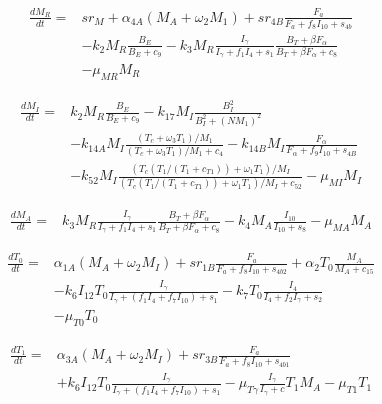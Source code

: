 \documentclass{article}
\begin{document}
	\begin{equation}
		\begin{aligned}
			\frac{dM_R}{dt} ={} & sr_M + \alpha_{4A}(M_A + \omega_2 M_1) + sr_{4B} \frac{F_a}{F_a + f_8 I_{10} + s_{4b}} \\
			& - k_2 M_R \frac{B_E}{B_E + c_9} -  k_3 M_R \frac{I_{\gamma}}{I_{\gamma} + f_1 I_4 + s_1} \frac{B_T + \beta F_{\alpha}}{B_T + \beta F_{\alpha} + c_8} \\
			&- \mu_{MR} M_R
		\end{aligned}
	\end{equation}
	
	\begin{equation}
		\begin{aligned}
			\frac{dM_I}{dt} ={} & k_2 M_R \frac{B_E}{B_E + c_9} - k_{17} M_I \frac{B_I^2} {B_I^2 + (N M_1)^2} \\
			& - k_{14A} M_I \frac{(T_c + \omega_3 T_1)/M_1}{(T_c + \omega_3 T_1)/M_1 + c_4} - k_{14B} M_I \frac{F_\alpha}{F_\alpha + f_9 I_{10} + s_{4B}} \\
			& - k_{52} M_I \frac{(T_c (T_1 / (T_1 + c_{T1})) + \omega_1 T_1)/M_I}{(T_c (T_1 / (T_1 + c_{T1})) + \omega_1 T_1)/M_I + c_{52}} - \mu_{MI} M_I
		\end{aligned}
	\end{equation}

	\begin{equation}
		\begin{aligned}
			\frac{dM_A}{dt} ={} & k_3 M_R \frac{I_{\gamma}}{I_{\gamma} + f_1 I_4 + s_1} \frac{B_T + \beta F_{\alpha}}{B_T + \beta F_{\alpha} + c_8} - k_4 M_A \frac{I_{10}}{I_{10} + s_8} - \mu_{MA} M_A
		\end{aligned}
	\end{equation}
	
	\begin{equation}
		\begin{aligned}
			\frac{dT_0}{dt} ={} & \alpha_{1A}(M_A + \omega_2 M_I) + sr_{1B} \frac{F_a}{F_a + f_8 I_{10} + s_{4b2}} + \alpha_2 T_0 \frac{M_A} {M_A + c_{15}}\\
			&- k_6 I_{12} T_0 \frac{I_\gamma}{I_\gamma + (f_1 I_4 + f_7 I_{10}) + s_1} - k_7 T_0 \frac{I_4}{I_4 + f_2 I_\gamma + s_2}\\
			&- \mu_{T0} T_0
		\end{aligned}
	\end{equation}
	
	\begin{equation}
		\begin{aligned}
			\frac{dT_1}{dt} ={} & \alpha_{3A}(M_A + \omega_2 M_I) + sr_{3B} \frac{F_a}{F_a + f_8 I_{10} + s_{4b1}}\\
			&+ k_6 I_{12} T_0 \frac{I_\gamma}{I_\gamma + (f_1 I_4 + f_7 I_{10}) + s_1} -\mu_{T\gamma} \frac{I_\gamma}{I_\gamma +c} T_1 M_A - \mu_{T1} T_1
		\end{aligned}
	\end{equation}
	
\end{document}
